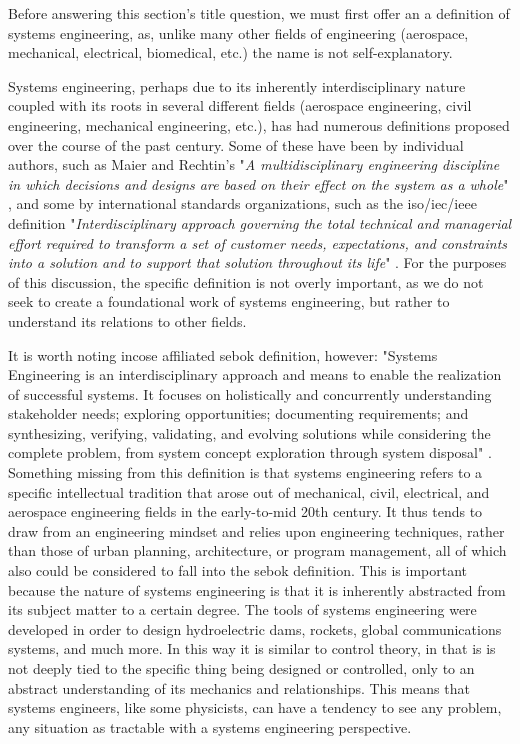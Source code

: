 Before answering this section's title question, we must first offer an a definition of systems engineering, as, unlike many other fields of engineering (aerospace, mechanical, electrical, biomedical, etc.) the name is not self-explanatory. 

Systems engineering, perhaps due to its inherently interdisciplinary nature coupled with its roots in several different fields (aerospace engineering, civil engineering, mechanical engineering, etc.), has had numerous definitions proposed over the course of the past century. Some of these have been by individual authors, such as Maier and Rechtin's "\textit{A multidisciplinary engineering discipline in which decisions and designs are based on their effect on the system as a whole}" \cite{maierArtSystemsArchitecting2009}, and some by international standards organizations, such as the \ac{iso}/\ac{iec}/\ac{ieee} definition "\textit{Interdisciplinary approach governing the total technical and managerial effort required to transform a set of customer needs, expectations, and constraints into a solution and to support that solution throughout its life}" \cite{internationalorganizationforstandardizationSystemsSoftwareEngineering2010} . For the purposes of this discussion, the specific definition is not overly important, as we do not seek to create a foundational work of systems engineering, but rather to understand its relations to other fields.

It is worth noting \ac{incose} affiliated \ac{sebok} definition, however: "Systems Engineering is an interdisciplinary approach and means to enable the realization of successful systems. It focuses on holistically and concurrently understanding stakeholder needs; exploring opportunities; documenting requirements; and synthesizing, verifying, validating, and evolving solutions while considering the complete problem, from system concept exploration through system disposal" \cite{systemsengineeringbodyofknowledgeSystemsEngineeringGlossary2021}. Something missing from this definition is that systems engineering refers to a specific intellectual tradition that arose out of mechanical, civil, electrical, and aerospace engineering fields in the early-to-mid 20th century. It thus tends to draw from an engineering mindset and relies upon engineering techniques, rather than those of urban planning, architecture, or program management, all of which also could be considered to fall into the \ac{sebok} definition. This is important because the nature of systems engineering is that it is inherently abstracted from its subject matter to a certain degree. The tools of systems engineering were developed in order to design hydroelectric dams, rockets, global communications systems, and much more. In this way it is similar to control theory, in that is is not deeply tied to the specific thing being designed or controlled, only to an abstract understanding of its mechanics and relationships. This means that systems engineers, like some physicists, can have a tendency to see any problem, any situation as tractable with a systems engineering perspective.

